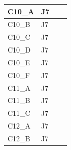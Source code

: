 \begin{longtable}{|l|l|l|l|}
C10\_A                           & J7                                                &                                                  &                                                  \\ \hline
C10\_B                           & J7                                                &                                                  &                                                  \\ \hline
C10\_C                           & J7                                                &                                                  &                                                  \\ \hline
C10\_D                           & J7                                                &                                                  &                                                  \\ \hline
C10\_E                           & J7                                                &                                                  &                                                  \\ \hline
C10\_F                           & J7                                                &                                                  &                                                  \\ \hline
C11\_A                           & J7                                                &                                                  &                                                  \\ \hline
C11\_B                           & J7                                                &                                                  &                                                  \\ \hline
C11\_C                           & J7                                                &                                                  &                                                  \\ \hline
C12\_A                           & J7                                                &                                                  &                                                  \\ \hline
C12\_B                           & J7                                                &                                                  &                                                  \\ \hline

\end{longtable}
